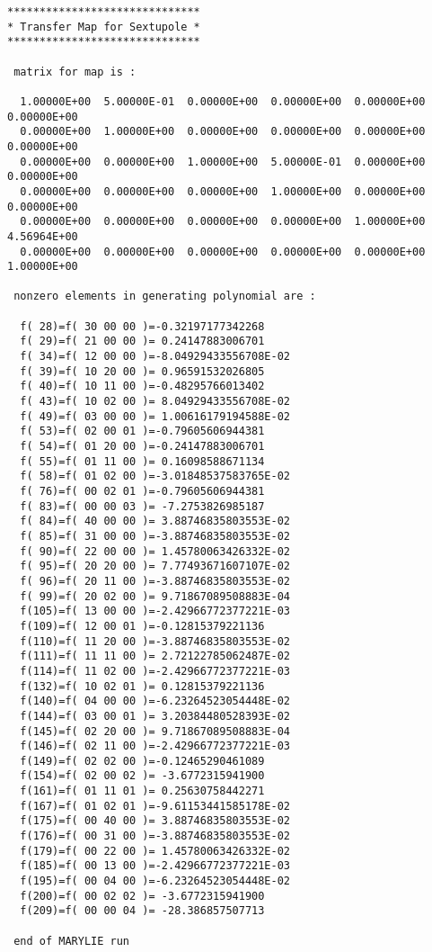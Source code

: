 \begin{footnotesize}
\begin{verbatim}
******************************
* Transfer Map for Sextupole *
******************************

 matrix for map is :

  1.00000E+00  5.00000E-01  0.00000E+00  0.00000E+00  0.00000E+00  0.00000E+00
  0.00000E+00  1.00000E+00  0.00000E+00  0.00000E+00  0.00000E+00  0.00000E+00
  0.00000E+00  0.00000E+00  1.00000E+00  5.00000E-01  0.00000E+00  0.00000E+00
  0.00000E+00  0.00000E+00  0.00000E+00  1.00000E+00  0.00000E+00  0.00000E+00
  0.00000E+00  0.00000E+00  0.00000E+00  0.00000E+00  1.00000E+00  4.56964E+00
  0.00000E+00  0.00000E+00  0.00000E+00  0.00000E+00  0.00000E+00  1.00000E+00

 nonzero elements in generating polynomial are :

  f( 28)=f( 30 00 00 )=-0.32197177342268
  f( 29)=f( 21 00 00 )= 0.24147883006701
  f( 34)=f( 12 00 00 )=-8.04929433556708E-02
  f( 39)=f( 10 20 00 )= 0.96591532026805
  f( 40)=f( 10 11 00 )=-0.48295766013402
  f( 43)=f( 10 02 00 )= 8.04929433556708E-02
  f( 49)=f( 03 00 00 )= 1.00616179194588E-02
  f( 53)=f( 02 00 01 )=-0.79605606944381
  f( 54)=f( 01 20 00 )=-0.24147883006701
  f( 55)=f( 01 11 00 )= 0.16098588671134
  f( 58)=f( 01 02 00 )=-3.01848537583765E-02
  f( 76)=f( 00 02 01 )=-0.79605606944381
  f( 83)=f( 00 00 03 )= -7.2753826985187
  f( 84)=f( 40 00 00 )= 3.88746835803553E-02
  f( 85)=f( 31 00 00 )=-3.88746835803553E-02
  f( 90)=f( 22 00 00 )= 1.45780063426332E-02
  f( 95)=f( 20 20 00 )= 7.77493671607107E-02
  f( 96)=f( 20 11 00 )=-3.88746835803553E-02
  f( 99)=f( 20 02 00 )= 9.71867089508883E-04
  f(105)=f( 13 00 00 )=-2.42966772377221E-03
  f(109)=f( 12 00 01 )=-0.12815379221136
  f(110)=f( 11 20 00 )=-3.88746835803553E-02
  f(111)=f( 11 11 00 )= 2.72122785062487E-02
  f(114)=f( 11 02 00 )=-2.42966772377221E-03
  f(132)=f( 10 02 01 )= 0.12815379221136
  f(140)=f( 04 00 00 )=-6.23264523054448E-02
  f(144)=f( 03 00 01 )= 3.20384480528393E-02
  f(145)=f( 02 20 00 )= 9.71867089508883E-04
  f(146)=f( 02 11 00 )=-2.42966772377221E-03
  f(149)=f( 02 02 00 )=-0.12465290461089
  f(154)=f( 02 00 02 )= -3.6772315941900
  f(161)=f( 01 11 01 )= 0.25630758442271
  f(167)=f( 01 02 01 )=-9.61153441585178E-02
  f(175)=f( 00 40 00 )= 3.88746835803553E-02
  f(176)=f( 00 31 00 )=-3.88746835803553E-02
  f(179)=f( 00 22 00 )= 1.45780063426332E-02
  f(185)=f( 00 13 00 )=-2.42966772377221E-03
  f(195)=f( 00 04 00 )=-6.23264523054448E-02
  f(200)=f( 00 02 02 )= -3.6772315941900
  f(209)=f( 00 00 04 )= -28.386857507713

 end of MARYLIE run
\end{verbatim}
\end{footnotesize}

